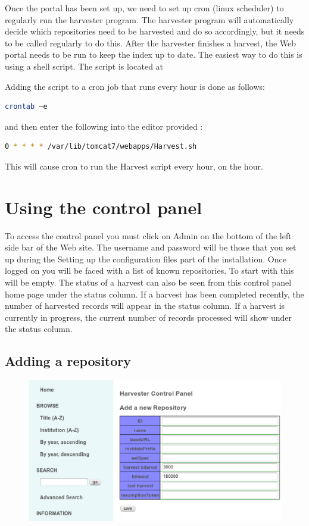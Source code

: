\documentclass[a4paper,11pt]{article}
\begin{document}
Once the portal has been set up, we need to set up cron (linux scheduler) to regularly run the harvester program. The harvester program will automatically decide which repositories need to be harvested and do so accordingly, but it needs to be called regularly to do this. After the harvester finishes a harvest, the Web portal needs to be run to keep the index up to date. The easiest way to do this is using a shell script. The script is located at 

Adding the script to a cron job that runs every hour is done as follows: 

\begin{lstlisting}[language=bash]
 crontab –e
\end{lstlisting}

and then enter the following into the editor provided : 

\begin{lstlisting}[language=bash]
 0 * * * * /var/lib/tomcat7/webapps/Harvest.sh
\end{lstlisting}

This will cause cron to run the Harvest script every hour, on the hour.

\section{Using the control panel}

To access the control panel you must click on Admin on the bottom of the left side bar of the Web site. The username and password will be those that you set up during the Setting up the configuration files part of the installation. Once logged on you will be faced with a list of known repositories. To start with this will be empty. The status of a harvest can also be seen from this control panel home page under the status column. If a harvest has been completed recently, the number of harvested records will appear in the status column. If a harvest is currently in progress, the current number of records processed will show under the status column.

\subsection{Adding a repository}

\begin{figure}[h]
 \centering
 \includegraphics[width=\textwidth]{adding_repository_infomation_x.eps}
\end{figure}
\end{document}
